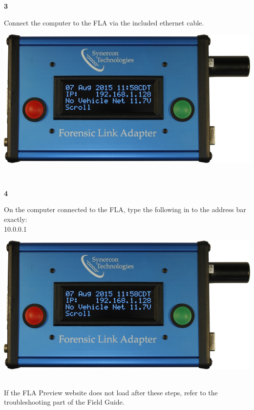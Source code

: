\documentclass[11pt]{article}
\begin{document}
\noindent\begin{minipage}{0.3\textwidth}%
\begin{center}
\textbf{3}\\[\baselineskip]
\end{center}
Connect the computer to the FLA via the included ethernet cable.
\end{minipage}%
\hfill%
\begin{minipage}{0.6\textwidth}
\includegraphics[width=\linewidth]{../../media/fla_screens/ethernet_and_others/main/title_no_net}
\end{minipage}\\[\baselineskip]
\noindent\begin{minipage}{0.3\textwidth}%
\begin{center}
\textbf{4}\\[\baselineskip]
\end{center}
On the computer connected to the FLA, type the following in to the address bar exactly:\\
10.0.0.1
\end{minipage}%
\hfill%
\begin{minipage}{0.6\textwidth}
\includegraphics[width=\linewidth]{../../media/fla_screens/ethernet_and_others/main/title_no_net}
\end{minipage}\\[\baselineskip]
If the FLA Preview website does not load after these steps, refer to the troubleshooting part of the Field Guide.
\end{document}
